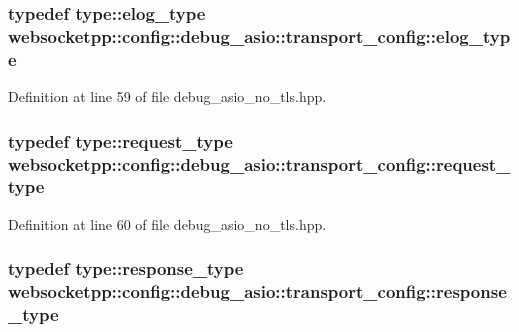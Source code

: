 \subsubsection[{elog\+\_\+type}]{\setlength{\rightskip}{0pt plus 5cm}typedef {\bf type\+::elog\+\_\+type} {\bf websocketpp\+::config\+::debug\+\_\+asio\+::transport\+\_\+config\+::elog\+\_\+type}}\label{structwebsocketpp_1_1config_1_1debug__asio_1_1transport__config_ae5bdb28a825df63a36a14290d5230e27}


Definition at line 59 of file debug\+\_\+asio\+\_\+no\+\_\+tls.\+hpp.

\hypertarget{structwebsocketpp_1_1config_1_1debug__asio_1_1transport__config_a4a6d4d4212e18ac8afe0a8b82ee4f925}{}
\subsubsection[{request\+\_\+type}]{\setlength{\rightskip}{0pt plus 5cm}typedef {\bf type\+::request\+\_\+type} {\bf websocketpp\+::config\+::debug\+\_\+asio\+::transport\+\_\+config\+::request\+\_\+type}}\label{structwebsocketpp_1_1config_1_1debug__asio_1_1transport__config_a4a6d4d4212e18ac8afe0a8b82ee4f925}


Definition at line 60 of file debug\+\_\+asio\+\_\+no\+\_\+tls.\+hpp.

\hypertarget{structwebsocketpp_1_1config_1_1debug__asio_1_1transport__config_ab54324c27a7c70ed8ba69ba719156286}{}
\subsubsection[{response\+\_\+type}]{\setlength{\rightskip}{0pt plus 5cm}typedef {\bf type\+::response\+\_\+type} {\bf websocketpp\+::config\+::debug\+\_\+asio\+::transport\+\_\+config\+::response\+\_\+type}}\label{structwebsocketpp_1_1config_1_1debug__asio_1_1transport__config_ab54324c27a7c70ed8ba69ba719156286}


